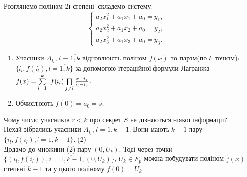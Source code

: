Розглянемо поліном 2ї степені:
складемо систему:
\begin{equation*}
 \begin{cases}
  a_2 x_1 ^2+a_1 x_1+a_0=y_1, 
   \\
  a_2x_2 ^2+a_1 x_2+a_0=y_2,
   \\
  a_2x_3 ^2+a_1 x_3+a_0=y_3.
 \end{cases}
\end{equation*}

\begin{enumerate}
\item Учасники $A_{i_l}$, $l=\overline{1,k}$ відновлюють поліном $f(x)$ по парам(по $k$ точкам):
${\{i_l, f(i_l),l=\overline{1,k}}\} $ за допомогою ітераційної формули Лагранжа $f(x)=\sum\limits_{l=1}^{k}\ f(i_l)\prod\limits_{j\ne l} {{x-i_j}\over{i_l-i_j}}$.
\item  Обчислюють $f(0)=a_0=s$.
\end{enumerate}
Чому число учасників $r<k$  про секрет $S$ не дізнаються ніякої інформації?\\
Нехай зібрались учасники $A_{i_l}$, $l=\overline{1,k-1}$. Вони мають $k-1$ пару ${\{i_l, f(i_l),l=\overline{1,k-1}}\} $.  (2)\\
Додамо до множини (2) пару $(0,U_k)$. Тоді через точки  ${\{(i_l,f(i_l)), i=\overline{1,k-1}, (0,U_k)}\} $, $U_k\in{F_p}$ можна побудувати поліном $\tilde{f}(x)$ степені $k-1$  та у цього поліному $f(0)=U_k$.

%